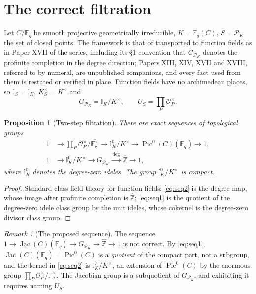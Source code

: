\documentclass[11pt]{amsart}
\numberwithin{equation}{section}
\newtheorem{proposition}[theorem]{Proposition}
\theoremstyle{definition}
\theoremstyle{remark}
\newtheorem{remark}[theorem]{Remark}
\newcommand{\Z}{\mathbb{Z}}
\newcommand{\F}{\mathbb{F}}
\newcommand{\hZ}{\widehat{\Z}}
\newcommand{\cO}{\mathcal{O}}
\newcommand{\cP}{\mathcal{P}}
\newcommand{\Idl}{\mathbb{I}}
\newcommand{\Pic}{\operatorname{Pic}}
\newcommand{\Jac}{\operatorname{Jac}}
\begin{document}
\maketitle

\section{The correct filtration}

Let $C/\F_q$ be smooth projective geometrically irreducible, $K=\F_q(C)$, $S=\cP_K$ the set
of closed points. The framework is that of \cite{Main} transported to function fields as in
Paper XVII of the series, including its \S1 convention that $G_{\cP_K}$ denotes the
profinite completion in the degree direction; Papers XIII, XIV, XVII and XVIII, referred to
by numeral, are unpublished companions, and every fact used from them is restated or
verified in place. Function fields have no archimedean places, so
$\Idl_S=\Idl_K$, $K^\times_S=K^\times$ and
\[
G_{\cP_K}=\Idl_K/\overline{K^\times},\qquad U_S=\prod_{P}\cO_P^\times .
\]

\begin{proposition}[Two-step filtration]\label{prop:filtration}
There are exact sequences of topological groups
\begin{align}
1&\longrightarrow \prod_P\cO_P^\times\big/\overline{\F_q^\times}\longrightarrow \Idl^0_K/K^\times\longrightarrow\Pic^0(C)(\F_q)\longrightarrow1,\label{eq:seq1}\\
1&\longrightarrow \Idl^0_K/K^\times\longrightarrow G_{\cP_K}\xrightarrow{\ \deg\ }\hZ\longrightarrow1,\label{eq:seq2}
\end{align}
where $\Idl^0_K$ denotes the degree-zero ideles. The group $\Idl^0_K/K^\times$ is compact.
\end{proposition}

\begin{proof}
Standard class field theory for function fields: \eqref{eq:seq2} is the degree map, whose
image after profinite completion is $\hZ$; \eqref{eq:seq1} is the quotient of the degree-zero
idele class group by the unit ideles, whose cokernel is the degree-zero divisor class group.
\end{proof}

\begin{remark}[The proposed sequence]\label{rem:proposedseq}
The sequence $1\to\Jac(C)(\F_q)\to G_{\cP_K}\to\hZ\to1$ is not correct. By
\eqref{eq:seq1}, $\Jac(C)(\F_q)=\Pic^0(C)$ is a \emph{quotient} of the compact part, not a
subgroup, and the kernel in \eqref{eq:seq2} is $\Idl^0_K/K^\times$, an extension of
$\Pic^0(C)$ by the enormous group $\prod_P\cO_P^\times/\overline{\F_q^\times}$. The Jacobian
group is a subquotient of $G_{\cP_K}$, and exhibiting it requires naming $U_S$.
\end{remark}
\end{document}
